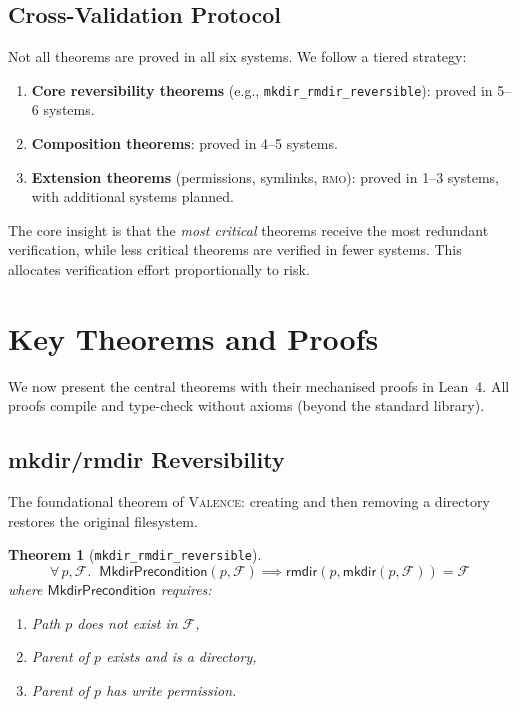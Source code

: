 \documentclass[11pt,a4paper]{article}
\newtheorem{theorem}{Theorem}[section]
\newcommand{\FS}{\mathcal{F}}
\newcommand{\valence}{\textsc{Valence}}
\newcommand{\rmo}{\textsc{rmo}}
\newcommand{\lean}{Lean~4}
\begin{document}
\subsection{Cross-Validation Protocol}

Not all theorems are proved in all six systems. We follow a tiered strategy:

\begin{enumerate}
  \item \textbf{Core reversibility theorems} (e.g.,
        \texttt{mkdir\_rmdir\_reversible}): proved in 5--6 systems.
  \item \textbf{Composition theorems}: proved in 4--5 systems.
  \item \textbf{Extension theorems} (permissions, symlinks, \rmo{}): proved
        in 1--3 systems, with additional systems planned.
\end{enumerate}

The core insight is that the \emph{most critical} theorems receive the most
redundant verification, while less critical theorems are verified in fewer
systems. This allocates verification effort proportionally to risk.

\section{Key Theorems and Proofs}
\label{sec:theorems}

We now present the central theorems with their mechanised proofs in \lean{}.
All proofs compile and type-check without axioms (beyond the standard library).

\subsection{mkdir/rmdir Reversibility}

The foundational theorem of \valence{}: creating and then removing a directory
restores the original filesystem.

\begin{theorem}[\texttt{mkdir\_rmdir\_reversible}]
\label{thm:mkdir-rmdir}
\[
  \forall\, p, \FS.\;\;
  \mathsf{MkdirPrecondition}(p, \FS) \implies
  \mathsf{rmdir}(p, \mathsf{mkdir}(p, \FS)) = \FS
\]
where $\mathsf{MkdirPrecondition}$ requires:
\begin{enumerate}[label=(\alph*)]
  \item Path $p$ does not exist in $\FS$,
  \item Parent of $p$ exists and is a directory,
  \item Parent of $p$ has write permission.
\end{enumerate}
\end{theorem}
\end{document}

